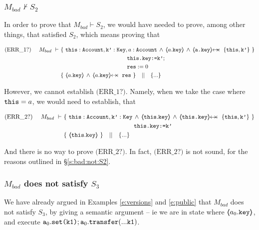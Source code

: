 \subsubsection{$M_{bad}  \nvdash S_2$}
\label{s:bad:not:S2:proof}

In order to prove that $M_{bad}  \vdash S_2$, we would have needed to prove, among other things,  that  satisfied $S_2$, which means proving that

\small{
\begin{align*}
\text{(ERR\_1?)}  \ \ \ \ M_{bad}\ \vdash \ 
		&	\{  \ \prg{this}:\prg{Account}, \prg{k'}:\prg{Key}, a:\prg{Account}\, \wedge\, \inside{a.\prg{key}}  \, \wedge \, \protectedFrom {\prg{a.key}} { \{\prg{this},\prg{k'}\} }\   \} \\
			& \SPT \SPT   \SPT\SPT  \prg{this.key:=k'}; \\
			& \SPT \SPT   \SPT\SPT \prg{res}:=0 \\ 
	       	& \{ \  \inside{a.\prg{key}}  \, \wedge \, \protectedFrom {a.\prg{key}} {\prg{res}} \   \} \ \ \  || \ \ \ 
		   \{ ... \}
\end{align*}
}

However, we cannot  establish $\text{(ERR\_1?)}$.
Namely, when we  take the case where $\mbox{\normalfont{\texttt{this}}}=a$,  we would need to establish, that

\small{
\begin{align*}
\text{(ERR\_2?)}  \ \ \ \ M_{bad}\ \vdash \ 
		&	\{  \ \prg{this}:\prg{Account}, \prg{k'}:\prg{Key}\, \wedge\, \inside{\prg{this}.\prg{key}}  \, \wedge \, \protectedFrom {\prg{this.key}} { \{\prg{this},\prg{k'}\} }\   \} \\
			& \SPT \SPT   \SPT\SPT  \prg{this.key:=k'}  \\
	       	& \{ \ \inside{\prg{this}.\prg{key}}  \   \} \ \ \  || \ \ \ 
		   \{ ... \}
\end{align*}
} 

And there is no way to prove $\text{(ERR\_2?)}$. In fact, $\text{(ERR\_2?)}$  is not sound, for the reasons outlined in \S \ref{s:bad:not:S2}.

\subsubsection{$M_{bad}$ does not satisfy $S_3$}

We have already argued in Examples \ref{e:versions} and \ref{e:public} that $M_{bad}$ does not satisfy $S_3$, by giving a semantic argument -- ie we are in state where $ \langle\!\!\langle a_0.\mbox{\normalfont{\texttt{key}}} \rangle\!\!\rangle$, and execute $\mbox{\normalfont{\texttt{a}}}_0.\mbox{\normalfont{\texttt{set(k1)}}}; \mbox{\normalfont{\texttt{a}}}_0.\mbox{\normalfont{\texttt{transfer}}}(...\mbox{\normalfont{\texttt{k1}}})$. 

